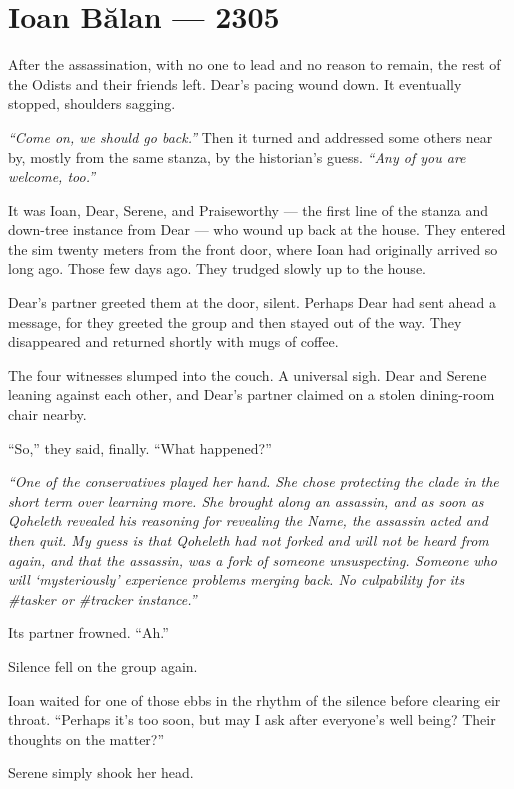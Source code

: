 \hypertarget{ioan-bux103lan-2305}{%
\chapter*{Ioan Bălan — 2305}\label{ioan-bux103lan-2305}}

After the assassination, with no one to lead and no reason to remain, the rest of the Odists and their friends left. Dear's pacing wound down. It eventually stopped, shoulders sagging.

\emph{``Come on, we should go back.''} Then it turned and addressed some others near by, mostly from the same stanza, by the historian's guess. \emph{``Any of you are welcome, too.''}

It was Ioan, Dear, Serene, and Praiseworthy — the first line of the stanza and down-tree instance from Dear — who wound up back at the house. They entered the sim twenty meters from the front door, where Ioan had originally arrived so long ago. Those few days ago. They trudged slowly up to the house.

Dear's partner greeted them at the door, silent. Perhaps Dear had sent ahead a message, for they greeted the group and then stayed out of the way. They disappeared and returned shortly with mugs of coffee.

The four witnesses slumped into the couch. A universal sigh. Dear and Serene leaning against each other, and Dear's partner claimed on a stolen dining-room chair nearby.

``So,'' they said, finally. ``What happened?''

\emph{``One of the conservatives played her hand. She chose protecting the clade in the short term over learning more. She brought along an assassin, and as soon as Qoheleth revealed his reasoning for revealing the Name, the assassin acted and then quit. My guess is that Qoheleth had not forked and will not be heard from again, and that the assassin, was a fork of someone unsuspecting. Someone who will `mysteriously' experience problems merging back. No culpability for its \#tasker or \#tracker instance.''}

Its partner frowned. ``Ah.''

Silence fell on the group again.

Ioan waited for one of those ebbs in the rhythm of the silence before clearing eir throat. ``Perhaps it's too soon, but may I ask after everyone's well being? Their thoughts on the matter?''

Serene simply shook her head.

